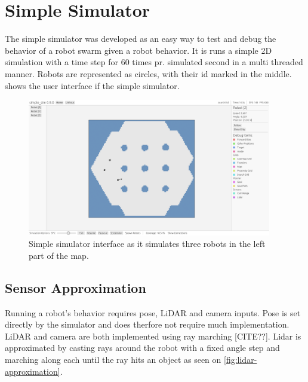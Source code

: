 
\section{Simple Simulator}
The simple simulator was developed as an easy way to test and debug the behavior of a robot swarm given a robot behavior. It is runs a simple 2D simulation with a time step for 60 times pr. simulated second in a multi threaded manner. Robots are represented as circles, with their id marked in the middle.  shows the user interface if the simple simulator.

\begin{figure}
    \begin{center}
        \includegraphics[width=0.95\textwidth]{figures/simple-sim-gui.png}
    \end{center}
    \caption{Simple simulator interface as it simulates three robots in the left part of the map.}\label{fig:simple-sim-interface}
\end{figure}


\subsection{Sensor Approximation}
Running a robot's behavior requires pose, LiDAR and camera inputs. Pose is set directly by the simulator and does therfore not require much implementation. LiDAR and camera are both implemented using ray marching {\color{red} [CITE??]}. Lidar is approximated by casting rays around the robot with a fixed angle step and marching along each until the ray hits an object as seen on \cref{fig:lidar-approximation}.



